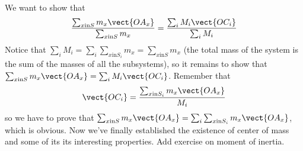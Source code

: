 We want to show that $$\frac{\sum_{x \textrm{in} S}{m_x \vect{OA_x}}}{\sum_{x \textrm{in} S}{m_x}}=\frac{\sum_i{M_i\vect{OC_i}}}{\sum_i{M_i}}$$
Notice that $\sum_i{M_i}=\sum_i{\sum_{x \textrm{in} S_i}{m_x}}=\sum_{x \textrm{in} S}{m_x}$ (the total mass of the system is the sum of the masses of all the subsystems), so it remains to show that $\sum_{x \textrm{in} S}{m_x \vect{OA_x}}=\sum_i{M_i\vect{OC_i}}$. Remember that $$\vect{OC_i}=\frac{\sum_{x \textrm{in} S_i}{m_x \vect{OA_x}}}{M_i}$$ so we have to prove that $\sum_{x \textrm{in} S}{m_x \vect{OA_x}}=\sum_i{\sum_{x \textrm{in} S_i}{m_x \vect{OA_x}}}$, which is obvious.
Now we've finally established the existence of center of mass and some of its its interesting properties.
Add exercise on moment of inertia.